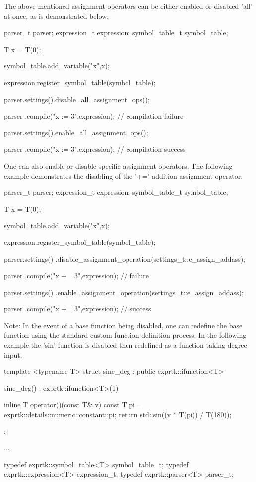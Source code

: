 The  above mentioned  assignment operators  can be  either enabled  or
disabled 'all' at once, as is demonstrated below:

parser\_t parser;
expression\_t expression;
symbol\_table\_t symbol\_table;

T x = T(0);

symbol\_table.add\_variable("x",x);

expression.register\_symbol\_table(symbol\_table);

parser.settings().disable\_all\_assignment\_ops();

parser
.compile("x := 3",expression); // compilation failure

parser.settings().enable\_all\_assignment\_ops();

parser
.compile("x := 3",expression); // compilation success


One  can also  enable or  disable specific  assignment operators.  The
following  example demonstrates  the  disabling  of the  '+=' addition
assignment operator:

parser\_t parser;
expression\_t expression;
symbol\_table\_t symbol\_table;

T x = T(0);

symbol\_table.add\_variable("x",x);

expression.register\_symbol\_table(symbol\_table);

parser.settings()
.disable\_assignment\_operation(settings\_t::e\_assign\_addass);

parser
.compile("x += 3",expression); // failure

parser.settings()
.enable\_assignment\_operation(settings\_t::e\_assign\_addass);

parser
.compile("x += 3",expression); // success


Note: In the event of a base function being disabled, one can redefine
the  base  function  using  the  standard  custom  function definition
process. In the  following example the 'sin' function is disabled then
redefined as a function taking degree input.

template <typename T>
struct sine\_deg : public exprtk::ifunction<T>
{
sine\_deg() : exprtk::ifunction<T>(1) {}

inline T operator()(const T\& v)
{
	const T pi = exprtk::details::numeric::constant::pi;
	return std::sin((v * T(pi)) / T(180));
}
};

...

typedef exprtk::symbol\_table<T> symbol\_table\_t;
typedef exprtk::expression<T>     expression\_t;
typedef exprtk::parser<T>             parser\_t;

